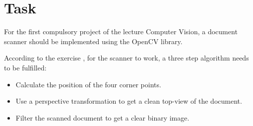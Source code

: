 \chapter{Task}
For the first compulsory project of the lecture Computer Vision, a document scanner should be implemented using the OpenCV library.

According to the exercise \cite{cv_lecture_ex}, for the scanner to work, a three step algorithm needs to be fulfilled:
\begin{itemize}
    \item Calculate the position of the four corner points.
    \item Use a perspective transformation to get a clean top-view of the document.
    \item Filter the scanned document to get a clear binary image.
\end{itemize}
